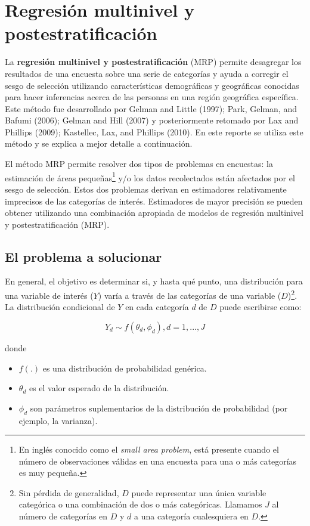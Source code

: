 \documentclass[]{article}
\let\rmarkdownfootnote\footnote%
\def\footnote{\protect\rmarkdownfootnote}
\begin{document}
\section{Regresión multinivel y
postestratificación}\label{regresion-multinivel-y-postestratificacion}

La \textbf{regresión multinivel y postestratificación} (MRP) permite
desagregar los resultados de una encuesta sobre una serie de categorías
y ayuda a corregir el sesgo de selección utilizando características
demográficas y geográficas conocidas para hacer inferencias acerca de
las personas en una región geográfica específica. Este método fue
desarrollado por Gelman and Little (1997); Park, Gelman, and Bafumi
(2006); Gelman and Hill (2007) y posteriormente retomado por Lax and
Phillips (2009); Kastellec, Lax, and Phillips (2010). En este reporte se
utiliza este método y se explica a mejor detalle a continuación.

El método MRP permite resolver dos tipos de problemas en encuestas: la
estimación de áreas pequeñas\footnote{En inglés conocido como el
  \emph{small area problem}, está presente cuando el número de
  observaciones válidas en una encuesta para una o más categorías es muy
  pequeña.} y/o los datos recolectados están afectados por el sesgo de
selección. Estos dos problemas derivan en estimadores relativamente
imprecisos de las categorías de interés. Estimadores de mayor precisión
se pueden obtener utilizando una combinación apropiada de modelos de
regresión multinivel y postestratificación (MRP).

\subsection{El problema a solucionar}\label{el-problema-a-solucionar}

En general, el objetivo es determinar si, y hasta qué punto, una
distribución para una variable de interés ($Y$) varía a través de las
categorías de una variable ($D$)\footnote{Sin pérdida de generalidad,
  $D$ puede representar una única variable categórica o una combinación
  de dos o más categóricas. Llamamos $J$ al número de categorías en $D$
  y $d$ a una categoría cualesquiera en $D$.}. La distribución
condicional de $Y$ en cada categoría $d$ de $D$ puede escribirse como:

\[
Y_d \sim f(\theta_d, \phi_d), d = 1, ..., J
\]

donde

\begin{itemize}
\itemsep1pt\parskip0pt
\item
  $f(.)$ es una distribución de probabilidad genérica.
\item
  $\theta_d$ es el valor esperado de la distribución.
\item
  $\phi_d$ son parámetros suplementarios de la distribución de
  probabilidad (por ejemplo, la varianza).
\end{itemize}
\end{document}
